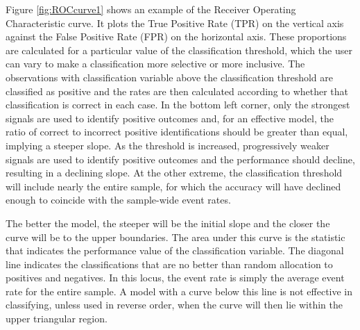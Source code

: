 Figure \ref{fig:ROCcurve1} shows an example of the Receiver Operating Characteristic curve.
It plots the True Positive Rate (TPR) on the vertical axis against the False Positive Rate (FPR) on the horizontal axis.
These proportions are calculated for a particular value of the classification threshold, which the user can vary to make a classification more selective or more inclusive.
The observations with classification variable above the classification threshold are classified as positive and the rates are then calculated according to whether that classification is correct in each case.
In the bottom left corner, only the strongest signals are used to identify positive outcomes and, for an effective model, the ratio of correct to incorrect positive identifications should be greater than equal, implying a steeper slope.
As the threshold is increased, progressively weaker signals are used to identify positive outcomes and the performance should decline, resulting in a declining slope.
At the other extreme, the classification threshold will include nearly the entire sample, for which the accuracy will have declined enough to coincide with the sample-wide event rates.



The better the model, the steeper will be the initial slope and the closer the curve will be to the upper boundaries.
The area under this curve is the statistic that indicates the performance value of the classification variable.
The diagonal line indicates the classifications that are no better than random allocation to positives and negatives.
In this locus, the event rate is simply the average event rate for the entire sample.
A model with a curve below this line is not effective in classifying, unless used in reverse order, when the curve will then lie within the upper triangular region.


